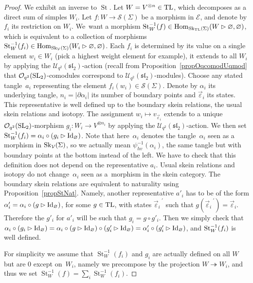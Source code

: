 \documentclass[pdftex]{sigma}%
\numberwithin{equation}{section}
\newcommand{\abss}[1]{\left\vert #1 \right\vert}
\newcommand{\St}{\operatorname{St}}
\newcommand{\Hom}{\operatorname{Hom}}
\newcommand{\Oq}{\mathcal{O}_{q^2}({\rm SL}_2)}
\newcommand{\Uq}{\mathcal{U}_{q^2}(\mathfrak{sl}_2)}
\begin{document}
\begin{proof}
We exhibit an inverse to $\St$. Let $W=V^{\otimes n}\in {\rm TL}$, which decomposes as a direct sum of simples $W_i$. Let $f\colon W\to \mathscr{S}(\Sigma)$ be a morphism in $\mathcal{E}$, and denote by $f_i$ its restriction on $W_i$. We~want a morphism $\St_W^{-1}(f) \in \Hom_{{\rm Sk}_{{\rm TL}}(\Sigma)}(W\rhd \varnothing,\varnothing)$, which is equivalent to a collection of morphisms ${\rm St}_W^{-1}(f_i) \in \Hom_{{\rm Sk}_{\mathcal{V}}(\Sigma)}(W_i\rhd \varnothing,\varnothing)$. Each $f_i$ is determined by its value on a single element $w_i\in W_i$ (pick a highest weight element for example), it extends to all $W_i$ by applying the $\Uq$-action (recall from Proposition~\ref{propOqcomodUqmod} that $\Oq$-comodules correspond to $\Uq$-modules). Choose any stated tangle~$a_i$ representing the element $f_i(w_i) \in \mathscr{S}(\Sigma)$. Denote by $\alpha_i$ its underlying tangle, $n_i=\abss{\partial \alpha_i}$ its number of boundary points and $\vec{\varepsilon}_i$ its states. This representative is well defined up to the boundary skein relations, the usual skein relations and isotopy. The assignment $w_i \mapsto v_{\vec{\varepsilon}_i}$ extends to a unique $ \Oq$-morphism $g_i\colon W_i \to V^{\otimes n_i}$ by applying the $\Uq$-action. We then set $\St_W^{-1}(f_i) = \alpha_i\circ (g_i \rhd {\rm Id}_\varnothing)$. Note that here~$\alpha_i$ denotes the tangle~$\alpha_i$ seen as a morphism in ${\rm Sk}_\mathcal{V}(\Sigma)$, so we actually mean $\psi_{hv}^{-1}(\alpha_i)$, the same tangle but with boundary points at the bottom instead of the left. We have to check that this definition does not depend on the representative $a_i$. Usual skein relations and isotopy do not change~$\alpha_i$ seen as a~morphism in the skein category. The boundary skein relations are equivalent to naturality using Proposition~\ref{propStNat}. Namely, another representative $a'_i$ has to be of the form $\alpha'_i= \alpha_i \circ (g \rhd {\rm Id}_\varnothing)$, for some $g \in {\rm TL}$, with states ${\vec{\varepsilon}_i}^{\ '}$ such that $g({\vec{\varepsilon}_i}^{\ '})=\vec{\varepsilon}_i$. Therefore the $g'_i$ for $a'_i$ will be such that $g_i = g \circ g'_i$. Then we simply check that $\alpha_i\circ (g_i \rhd {\rm Id}_\varnothing) = \alpha_i\circ (g \rhd {\rm Id}_\varnothing) \circ (g'_i \rhd {\rm Id}_\varnothing) = \alpha'_i\circ (g'_i \rhd {\rm Id}_\varnothing)$, and ${\rm St}_W^{-1}(f_i)$ is well defined.

For simplicity we assume that $\St_W^{-1}(f_i)$ and $g_i$ are actually defined on all $W$ but are 0 except on~$W_i$, namely we precompose by the projection $W \twoheadrightarrow W_i$, and thus we set $\St_W^{-1}(f) = \sum_i \St_W^{-1}(f_i)$.


\end{proof}
\end{document}
